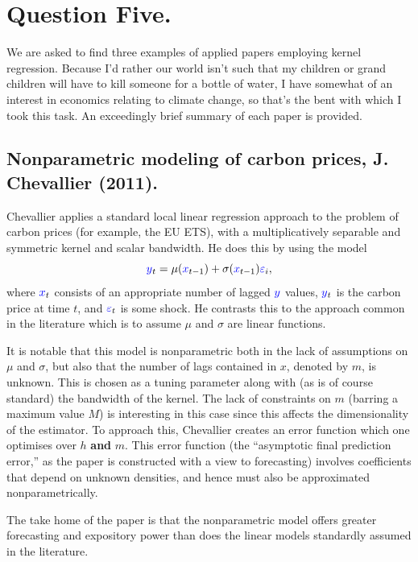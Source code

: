 \documentclass{article}
\renewcommand{\r}[1]{\textcolor{blue}{#1}}
\begin{document}
\section{Question Five.}
We are asked to find three examples of applied papers employing kernel regression. Because I'd rather our world isn't such that my children or grand children will have to kill someone for a bottle of water, I have somewhat of an interest in economics relating to climate change, so that's the bent with which I took this task. An exceedingly brief summary of each paper is provided.

\subsection{Nonparametric modeling of carbon prices, J. Chevallier (2011)\cite{chevallier2011}.} 
Chevallier applies a standard local linear regression approach to the problem of carbon prices (for example, the EU ETS), with a multiplicatively separable and symmetric kernel and scalar bandwidth. He does this by using the model
\begin{equation} \r{y}_{t} = \mu(\r{x}_{t-1})+\sigma(\r{x}_{t-1})\r{\varepsilon}_{i},\end{equation}
where $\r{x}_{t}$ consists of an appropriate number of lagged $\r{y}$ values, $\r{y}_{t}$ is the carbon price at time $t$, and $\r{\varepsilon}_{t}$ is some shock. He contrasts this to the approach common in the literature which is to assume $\mu$ and $\sigma$ are linear functions.  

It is notable that this model is nonparametric both in the lack of assumptions on $\mu$ and $\sigma$, but also that the number of lags contained in $x$, denoted by $m$, is unknown. This is chosen as a tuning parameter along with (as is of course standard) the bandwidth of the kernel. The lack of constraints on $m$ (barring a maximum value $M$) is interesting in this case since this affects the dimensionality of the estimator. To approach this, Chevallier creates an error function which one optimises over $h$ \textbf{and} $m$. This error function (the ``asymptotic final prediction error,'' as the paper is constructed with a view to forecasting) involves coefficients that depend on unknown densities, and hence must also be approximated nonparametrically.

The take home of the paper is that the nonparametric model offers greater forecasting and expository power than does the linear models standardly assumed in the literature. 
\end{document}
